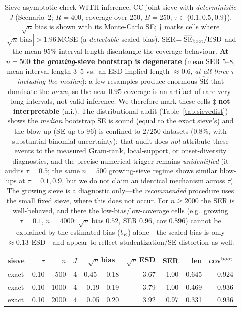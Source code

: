 \begin{table}[t]\centering\small
\caption{Sieve asymptotic check WITH inference, CC joint-sieve with \emph{deterministic} $J$ (Scenario~2; $R=400$, coverage over $250$, $B=250$; $\tau\in\{0.1,0.5,0.9\}$). $\sqrt n\,$bias is shown with its Monte-Carlo SE; $\dagger$ marks cells where $|\sqrt n\,\mathrm{bias}|>1.96\,$MCSE (a \emph{detectable} scaled bias). SER$=\overline{\mathrm{SE}}_{\rm boot}/\mathrm{ESD}$ and the mean $95\%$ interval length disentangle the coverage behaviour. \textbf{At $n{=}500$ the \emph{growing}-sieve bootstrap is degenerate} (mean SER $5$--$8$, mean interval length $3$--$5$ vs.\ an ESD-implied length $\approx0.6$, \emph{at all three $\tau$ including the median}): a few resamples produce enormous $\widehat{\mathrm{SE}}$ that dominate the \emph{mean}, so the near-$0.95$ coverage is an artifact of rare very-long intervals, not valid inference. We therefore mark these cells $\ddagger$ \textbf{not interpretable} (n.i.). The distributional audit (Table~\ref{tab:sievedist}) shows the \emph{median} bootstrap SE is sound (equal to the exact sieve's) and the blow-up (SE up to $96$) is confined to $2/250$ datasets ($0.8\%$, with substantial binomial uncertainty); that audit does \emph{not} attribute these events to the measured Gram-rank, local-support, or onset-diversity diagnostics, and the precise numerical trigger remains \emph{unidentified} (it audits $\tau{=}0.5$; the same $n{=}500$ growing-sieve regime shows similar blow-ups at $\tau{=}0.1,0.9$, but we do not claim an identical mechanism across $\tau$). The growing sieve is a diagnostic only---the \emph{recommended} procedure uses the small fixed sieve, where this does not occur. For $n\ge2000$ the SER is well-behaved, and there the low-bias/low-coverage cells (e.g.\ growing $\tau{=}0.1$, $n{=}4000$: $\sqrt n\,$bias $0.52$, SER $0.96$, cov $0.896$) cannot be explained by the estimated bias ($b_K$) alone---the scaled bias is only $\approx0.13$ ESD---and appear to reflect studentization/SE distortion as well.}
\label{tab:sieve}\begin{tabular}{lrr r r@{$\,\pm\,$}l r rr r}\toprule
sieve&$\tau$&$n$&$J$&\multicolumn{2}{c}{$\sqrt n\,$bias}&$\sqrt n\,$ESD&SER&len&cov$^{\rm boot}$\\\midrule
exact & 0.10 & 500 & 4 & 0.45$^\dagger$ & 0.18 & 3.67 & 1.00 & 0.645 & 0.924 \\
exact & 0.10 & 1000 & 4 & 0.19 & 0.19 & 3.79 & 1.00 & 0.469 & 0.936 \\
exact & 0.10 & 2000 & 4 & 0.05 & 0.20 & 3.92 & 0.97 & 0.331 & 0.936 \\

\end{tabular}
\end{table}
